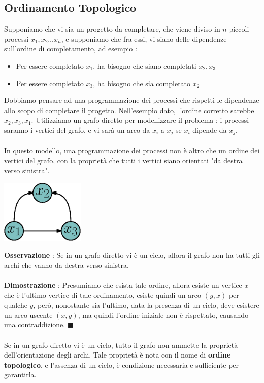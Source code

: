 \documentclass[12pt, letterpaper]{article}
\newcommand{\acc}{\\\hphantom{}\\}
\begin{document}
\subsection{Ordinamento Topologico}\label{OrdTop}
Supponiamo che vi sia un progetto da completare, che viene diviso in \(n\) piccoli processi
\(x_1,x_2\dots x_n\), e supponiamo che fra essi, vi siano delle dipendenze sull'ordine di completamento, ad
esempio : \begin{itemize}
    \item Per essere completato \(x_1\), ha bisogno che siano completati \(x_2,x_3\)
    \item Per essere completato \(x_3\), ha bisogno che sia completato \(x_2\)
\end{itemize}
Dobbiamo pensare ad una programmazione dei processi che rispetti le dipendenze allo scopo di completare il progetto.
Nell'esempio dato, l'ordine corretto sarebbe \(x_2,x_3,x_1\). Utilizziamo un grafo diretto per modellizzare il
problema : i processi saranno i vertici del grafo, e vi sarà un arco da \(x_i\) a \(x_j\) se \(x_i\) dipende
da \(x_j\).\acc In questo modello, una programmazione dei processi non è altro che un ordine dei vertici
del grafo, con la proprietà che tutti i vertici siano orientati "da destra verso sinistra".\begin{center}
    \includegraphics[width=0.3\textwidth ]{images/processiGrafo.eps}
\end{center}
\textbf{Osservazione} : Se in un grafo diretto vi è un ciclo, allora il grafo non ha tutti gli archi che vanno
da destra verso sinistra. \acc
\textbf{Dimostrazione} : Presumiamo che esista tale ordine, allora esiste un vertice \(x\) che è l'ultimo vertice
di tale ordinamento, esiste quindi un arco \((y,x)\) per qualche \(y\), però, nonostante sia l'ultimo,
data la presenza di un ciclo, deve esistere un arco uscente \((x,y)\), ma quindi l'ordine iniziale non è rispettato,
causando una contraddizione. \(\blacksquare\)\acc
Se in un grafo diretto vi è un ciclo, tutto il grafo non ammette la proprietà dell'orientazione degli archi. Tale
proprietà è nota con il nome di \textbf{ordine topologico}, e l'assenza di un ciclo, è condizione necessaria
e sufficiente per garantirla.\acc
\end{document}
